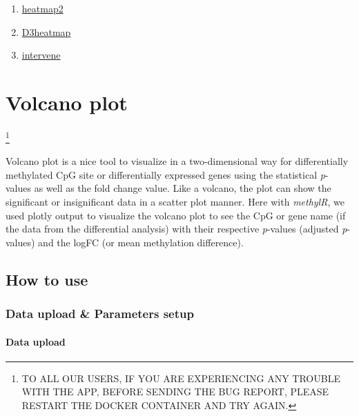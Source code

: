 \documentclass[
  a4paper,
  oneside,
  open=any]{scrreport}
\providecommand{\tightlist}{%
  \setlength{\itemsep}{0pt}\setlength{\parskip}{0pt}}\usepackage{longtable,booktabs,array}
\begin{document}
\begin{enumerate}
\def\labelenumi{\arabic{enumi}.}
\tightlist
\item
  \href{https://biocorecrg.github.io/CRG_RIntroduction/heatmap-2-function-from-gplots-package.html}{heatmap2}
\item
  \href{https://github.com/talgalili/d3heatmap}{D3heatmap}
\item
  \href{https://github.com/asntech/intervene}{intervene}
\end{enumerate}

\hypertarget{sec-volcano}{%
\chapter{Volcano plot}\label{sec-volcano}}

\footnote{TO ALL OUR USERS, IF YOU ARE EXPERIENCING ANY TROUBLE WITH THE
  APP, BEFORE SENDING THE BUG REPORT, PLEASE RESTART THE DOCKER
  CONTAINER AND TRY AGAIN.}

Volcano plot is a nice tool to visualize in a two-dimensional way for
differentially methylated CpG site or differentially expressed genes
using the statistical \emph{p}-values as well as the fold change value.
Like a volcano, the plot can show the significant or insignificant data
in a scatter plot manner. Here with \emph{methylR}, we used plotly
output to visualize the volcano plot to see the CpG or gene name (if the
data from the differential analysis) with their respective
\emph{p}-values (adjusted \emph{p}-values) and the logFC (or mean
methylation difference).

\hypertarget{how-to-use-5}{%
\section{How to use}\label{how-to-use-5}}

\hypertarget{data-upload-parameters-setup-2}{%
\subsection{Data upload \& Parameters
setup}\label{data-upload-parameters-setup-2}}

\hypertarget{data-upload-2}{%
\subsubsection{Data upload}\label{data-upload-2}}
\end{document}
